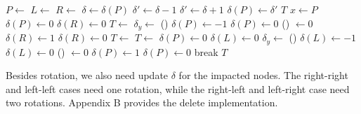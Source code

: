 \documentclass[b5paper]{article}
\begin{document}
\begin{algorithmic}[1]
    \State $P \gets $ 
    \State $L \gets $ 
    \State $R \gets $ 
    \State $\delta \gets \delta(P)$
      \State $\delta' \gets \delta - 1$
    \Else
      \State $\delta' \gets \delta + 1$
    \EndIf
    \State $\delta(P) \gets \delta'$
     
      \State \Return $T$
     
      \State $x \gets P$
         
          \State $\delta(P) \gets 0$ 
          \State $\delta(R) \gets 0$
          \State $T \gets $ 
        \EndIf
         
          \State $\delta_y \gets $ \textproc{$\delta$}() 
            \State $\delta(P) \gets -1$
          \Else
            \State $\delta(P) \gets 0$
          \EndIf
          \State \textproc{$\delta$}() $\gets 0$
            \State $\delta(R) \gets 1$
          \Else
            \State $\delta(R) \gets 0$
          \EndIf
          \State $T \gets $ 
          \State $T \gets $ 
        \EndIf
      \EndIf
         
          \State $\delta(P) \gets 0$
          \State $\delta(L) \gets 0$
          \State {}
        \Else {}
          \State $\delta_y \gets $ \textproc{$\delta$}()
            \State $\delta(L) \gets -1$
          \Else
            \State $\delta(L) \gets 0$
          \EndIf
          \State \textproc{$\delta$}() $\gets 0$
            \State $\delta(P) \gets 1$
          \Else
            \State $\delta(P) \gets 0$
          \EndIf
          \State {}
          \State {}
        \EndIf
      \EndIf
      \State break
    \EndIf
  \EndWhile
  \State \Return $T$
\EndFunction
\end{algorithmic}

Besides rotation, we also need update $\delta$ for the impacted nodes. The right-right and left-left cases need one rotation, while the right-left and left-right case need two rotations. Appendix B provides the delete implementation.
\end{document}
